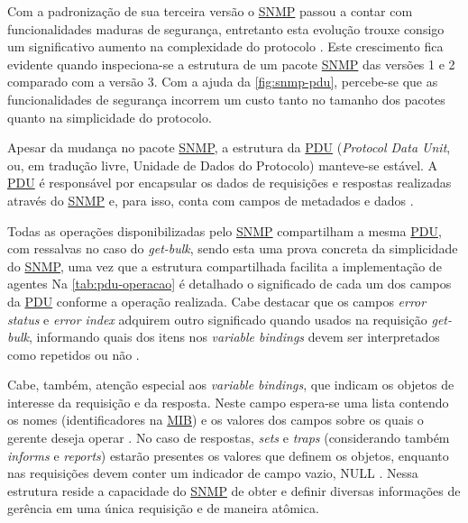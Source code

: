 \documentclass[twoside,english,brazilian]{UNISINOSmonografia}
\begin{document}
Com a padronização de sua terceira versão o \hyperref[siglas]{SNMP} passou a contar com 
funcionalidades maduras de segurança, entretanto esta evolução trouxe 
consigo um significativo aumento na complexidade do protocolo
\cite{Mauro2009}.
Este crescimento fica evidente quando inspeciona-se a estrutura de um pacote 
\hyperref[siglas]{SNMP} das versões 1 e 2 comparado com a versão 3.
Com a ajuda da \autoref{fig:snmp-pdu}, percebe-se que as funcionalidades de 
segurança incorrem um custo tanto no tamanho dos pacotes quanto na 
simplicidade do protocolo.


Apesar da mudança no pacote \hyperref[siglas]{SNMP}, a estrutura da \hyperref[siglas]{PDU} (\textit{Protocol Data 
Unit}, ou, em tradução livre, Unidade de Dados do Protocolo) manteve-se 
estável.
A \hyperref[siglas]{PDU} é responsável por encapsular os dados de requisições e respostas 
realizadas através do \hyperref[siglas]{SNMP} e, para isso, conta com campos de metadados 
e dados \cite{perkins1997understanding}.


Todas as operações disponibilizadas pelo \hyperref[siglas]{SNMP} compartilham a mesma \hyperref[siglas]{PDU}, 
com ressalvas no caso do \textit{get-bulk}, sendo esta uma prova concreta
da simplicidade do \hyperref[siglas]{SNMP}, uma vez que a estrutura compartilhada facilita
a implementação de agentes \cite{Clemm2006}
Na \autoref{tab:pdu-operacao} é detalhado o significado de cada um dos
campos da \hyperref[siglas]{PDU} conforme a operação realizada.
Cabe destacar que os campos \textit{error status} e \textit{error index} 
adquirem outro significado quando usados na requisição \textit{get-bulk},
informando quais dos itens nos \textit{variable bindings} devem ser 
interpretados como repetidos ou não \cite{perkins1997understanding}.


Cabe, também, atenção especial aos \textit{variable bindings}, que indicam 
os objetos de interesse da requisição e da resposta.
Neste campo espera-se uma lista contendo os nomes (identificadores na \hyperref[siglas]{MIB}) 
e os valores dos campos sobre os quais o gerente deseja operar 
\cite{Simoneau1999}.
No caso de respostas, \textit{sets} e \textit{traps} 
(considerando também \textit{informs} e \textit{reports})
estarão presentes os valores que definem os objetos, enquanto nas requisições
devem conter um indicador de campo vazio, NULL \cite{Clemm2006}.
Nessa estrutura reside a capacidade do \hyperref[siglas]{SNMP} de obter e definir diversas 
informações de gerência em uma única requisição e de maneira atômica.
\end{document}

